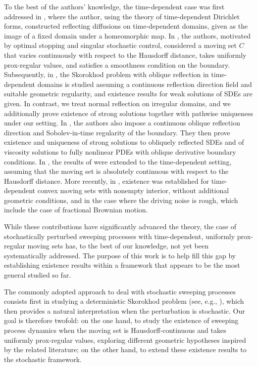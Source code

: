 \documentclass[preprint,12pt]{elsarticle}
\theoremstyle{plain}
\theoremstyle{definition}
\theoremstyle{remark}
\begin{document}
To the best of the authors' knowledge, the time-dependent case was first addressed in \cite{oshima2004construction}, where the author, using the theory of time-dependent Dirichlet forms, constructed reflecting diffusions on time-dependent domains, given as the image of a fixed domain under a homeomorphic map. In \cite{Costantini2006Boundary}, the authors, motivated by optimal stopping and singular stochastic control, considered a moving set $C$ that varies continuously with respect to the Hausdorff distance, takes uniformly prox-regular values, and satisfies a smoothness condition on the boundary. Subsequently, in \cite{MR2683628}, the Skorokhod problem with oblique reflection in time-dependent domains is studied assuming a continuous reflection direction field and suitable geometric regularity, and existence results for weak solutions of SDEs are given. In contrast, we treat normal reflection on irregular domains, and we additionally prove existence of strong solutions together with pathwise uniqueness under our setting. In \cite{lundstrom2019stochastic}, the authors also impose a continuous oblique reflection direction and Sobolev-in-time regularity of the boundary. They then prove existence and uniqueness of strong solutions to obliquely reflected SDEs and of viscosity solutions to fully nonlinear PDEs with oblique derivative boundary conditions. In \cite{MR2812587}, the results of \cite{MR873889,MR745330} were extended to the time-dependent setting, assuming that the moving set is absolutely continuous with respect to the Hausdorff distance. More recently, in \cite{MR3509666,MR4461030}, existence was established for time-dependent convex moving sets with nonempty interior, without additional geometric conditions, and in the case where the driving noise is rough, which include the case of fractional Brownian motion.

While these contributions have significantly advanced the theory, the case of stochastically perturbed sweeping processes with time-dependent, uniformly prox-regular moving sets has, to the best of our knowledge, not yet been systematically addressed. The purpose of this work is to help fill this gap by establishing existence results within a framework that appears to be the most general studied so far.

The commonly adopted approach to deal with stochastic sweeping processes consists first in studying a deterministic Skorokhod problem (see, e.g., \cite{MR873889, MR529332, MR745330, MR2812587}), which then provides a natural interpretation when the perturbation is stochastic. Our goal is therefore twofold: on the one hand, to study the existence of sweeping process dynamics when the moving set is Hausdorff-continuous and takes uniformly prox-regular values, exploring different geometric hypotheses inspired by the related literature; on the other hand, to extend these existence results to the stochastic framework.
\end{document}
